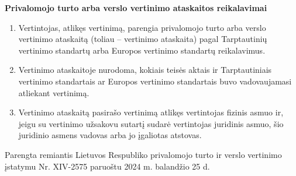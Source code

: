 \textbf{Privalomojo turto arba verslo vertinimo ataskaitos reikalavimai}
\begin{enumerate}
    \item Vertintojas, atlikęs vertinimą, parengia privalomojo turto arba verslo vertinimo ataskaitą (toliau – vertinimo ataskaita) pagal Tarptautinių vertinimo standartų arba Europos vertinimo standartų reikalavimus.
    \item Vertinimo ataskaitoje nurodoma, kokiais teisės aktais ir Tarptautiniais vertinimo standartais ar Europos vertinimo standartais buvo vadovaujamasi atliekant vertinimą.
    \item Vertinimo ataskaitą pasirašo vertinimą atlikęs vertintojas fizinis asmuo ir, jeigu su vertinimo užsakovu sutartį sudarė vertintojas juridinis asmuo, šio juridinio asmens vadovas arba jo įgaliotas atstovas.
\end{enumerate}

Parengta remiantis Lietuvos Respubliko privalomojo turto ir verslo vertinimo įstatymu Nr. XIV-2575 paruoštu 2024 m. balandžio 25 d.

\pagebreak